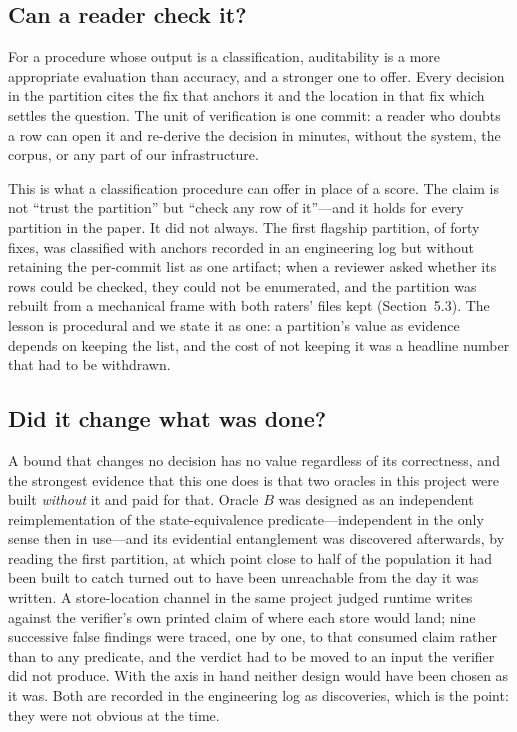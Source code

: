 \subsection{Can a reader check it?}

For a procedure whose output is a classification, auditability is a more appropriate
evaluation than accuracy, and a stronger one to offer. Every decision in the
partition cites the fix that anchors it and the location in that fix which settles
the question. The unit of verification is one commit: a reader who doubts a row can
open it and re-derive the decision in minutes, without the system, the corpus, or
any part of our infrastructure.

This is what a classification procedure can offer in place of a score. The claim is
not ``trust the partition'' but ``check any row of it''---and it holds for every partition
in the paper. It did not always. The first flagship partition, of forty fixes, was
classified with anchors recorded in an engineering log but without retaining the
per-commit list as one artifact; when a reviewer asked whether its rows could be
checked, they could not be enumerated, and the partition was rebuilt from a
mechanical frame with both raters' files kept (Section~5.3). The lesson is procedural
and we state it as one: a partition's value as evidence depends on keeping the list,
and the cost of not keeping it was a headline number that had to be withdrawn.

\subsection{Did it change what was done?}

A bound that changes no decision has no value regardless of its correctness, and
the strongest evidence that this one does is that two oracles in this project were
built \emph{without} it and paid for that. Oracle $B$ was designed as an independent
reimplementation of the state-equivalence predicate---independent in the only sense
then in use---and its evidential entanglement was discovered afterwards, by reading
the first partition, at which point close to half of the population it had been built
to catch turned out to have been unreachable from the day it was written. A store-location channel in
the same project judged runtime writes against the verifier's own printed claim of
where each store would land; nine successive false findings were traced, one by one,
to that consumed claim rather than to any predicate, and the verdict had to be moved
to an input the verifier did not produce. With the axis in hand neither design would
have been chosen as it was. Both are recorded in the engineering log as discoveries,
which is the point: they were not obvious at the time.

